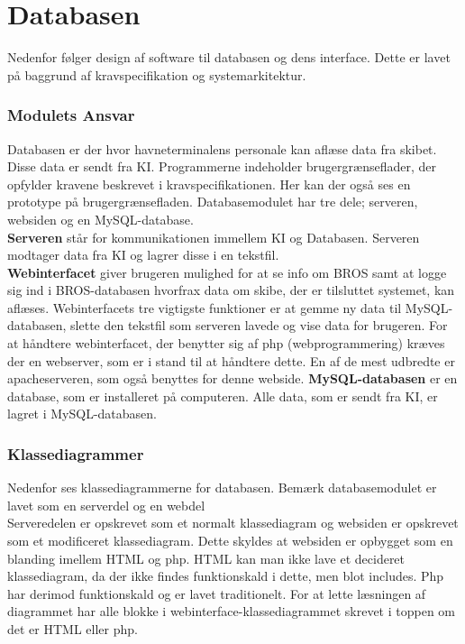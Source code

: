 \chapter{Databasen}
Nedenfor følger design af software til databasen og dens interface. Dette er lavet på baggrund af kravspecifikation og systemarkitektur. 


\subsection{Modulets Ansvar}
Databasen er der hvor havneterminalens personale kan aflæse data fra skibet. Disse data er sendt fra KI. Programmerne indeholder brugergrænseflader, der opfylder kravene beskrevet i kravspecifikationen. Her kan der også ses en prototype på brugergrænsefladen.
Databasemodulet har tre dele; serveren, websiden og en MySQL-database. \\
\textbf{Serveren} står for kommunikationen immellem KI og Databasen. Serveren modtager data fra KI og lagrer disse i en tekstfil.\\
\textbf{Webinterfacet} giver brugeren mulighed for at se info om BROS samt at logge sig ind i BROS-databasen hvorfrax data om skibe, der er tilsluttet systemet, kan aflæses. Webinterfacets tre vigtigste funktioner er at gemme ny data til MySQL-databasen, slette den tekstfil som serveren lavede og vise data for brugeren. For at håndtere webinterfacet, der benytter sig af php (webprogrammering) kræves der en webserver, som er i stand til at håndtere dette. En af de mest udbredte er apacheserveren, som også benyttes for denne webside.
\textbf{MySQL-databasen} er en database, som er  installeret på computeren. Alle data, som er sendt fra KI, er lagret i MySQL-databasen.

\subsection{Klassediagrammer}
Nedenfor ses klassediagrammerne for databasen. Bemærk databasemodulet er lavet som en serverdel og en webdel\\
Serveredelen er opskrevet som et normalt klassediagram og websiden er opskrevet som et modificeret klassediagram. Dette skyldes at websiden er opbygget som en blanding imellem HTML og php. HTML kan man ikke lave et decideret klassediagram, da der ikke findes funktionskald i dette, men blot includes. Php har derimod funktionskald og er lavet traditionelt. For at lette læsningen af diagrammet har alle blokke i webinterface-klassediagrammet skrevet i toppen om det er HTML eller php.

